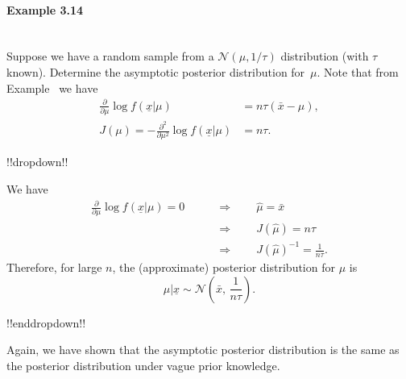 \paragraph{Example 3.14}{~\\
Suppose we have a random sample from a $\mathcal{N}(\mu,1/\tau)$ distribution
(with $\tau$ known). Determine the asymptotic posterior distribution
for~$\mu$. Note that from Example~ we have
\begin{align*}
\frac{\partial}{\partial\mu} \log
f(\underline{x}|\mu)&=n\tau(\bar x-\mu), \\
J(\mu)=-\frac{\partial^2}{\partial\mu^2} \log
f(\underline{x}|\mu)&=n\tau.
\end{align*}



!!dropdown!!

We have
    \begin{align*}
    \frac{\partial}{\partial\mu} \log f(\underline{x}|\mu)=0
    \quad\quad&\Longrightarrow\quad\quad
    \hat\mu=\bar x \\
    &\Longrightarrow\quad\quad
    J(\hat\mu)=n\tau \\
    &\Longrightarrow\quad\quad
    J(\hat\mu)^{-1}=\frac{1}{n\tau}.
    \end{align*}
    Therefore, for large $n$, the (approximate) posterior distribution for $\mu$ is
    $$
    \mu|\underline{x}\sim \mathcal{N}\left(\bar x,\,\frac{1}{n\tau}\right).
    $$

!!enddropdown!!

Again, we have shown that the asymptotic posterior distribution is the
same as the posterior distribution under vague prior knowledge.}

